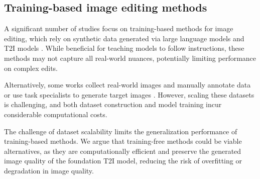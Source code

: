 \documentclass{article}
\newenvironment{cyanpar}{\color{cyan}}{}
\begin{document}
\subsection{Training-based image editing methods}

\begin{cyanpar}
A significant number of studies focus on training-based methods for image editing, which rely on synthetic data generated via large language models and T2I models \citep{brooks2023instructpix2pix, hui2024hq}. While beneficial for teaching models to follow instructions, these methods may not capture all real-world nuances, potentially limiting performance on complex edits.

Alternatively, some works collect real-world images and manually annotate data or use task specialists to generate target images \citep{zhang2023magicbrush, wasserman2024paint, wei2024omniedit}. However, scaling these datasets is challenging, and both dataset construction and model training incur considerable computational costs.

The challenge of dataset scalability limits the generalization performance of training-based methods. We argue that training-free methods could be viable alternatives, as they are computationally efficient and preserve the generated image quality of the foundation T2I model, reducing the risk of overfitting or degradation in image quality.

\end{cyanpar}


\end{document}
